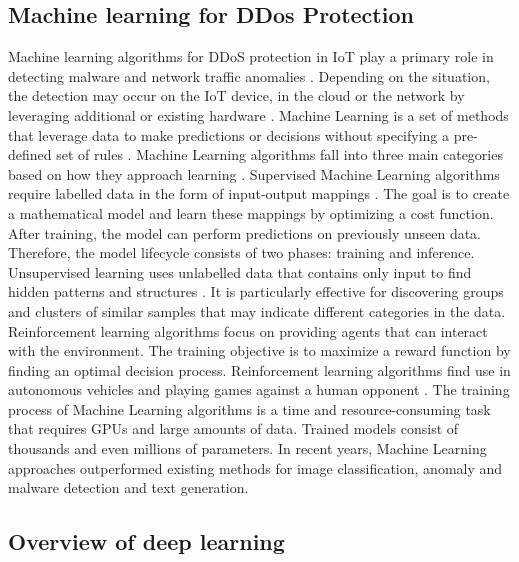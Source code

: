\documentclass[conference, 11pt]{IEEEtran}
\begin{document}
    \subsection{Machine learning for DDos Protection}
    Machine learning algorithms for DDoS protection in IoT play a primary role in detecting malware and network traffic anomalies \cite{article:18}.
    Depending on the situation, the detection may occur on the IoT device, in the cloud or the network by leveraging additional or existing hardware \cite{article:5}.
    Machine Learning is a set of methods that leverage data to make predictions or decisions without specifying a pre-defined set of rules \cite{Goodfellow-et-al-2016}.
    Machine Learning algorithms fall into three main categories based on how they approach learning \cite{article:6}.
    Supervised Machine Learning algorithms require labelled data in the form of input-output mappings \cite{Goodfellow-et-al-2016}.
    The goal is to create a mathematical model and learn these mappings by optimizing a cost function.
    After training, the model can perform predictions on previously unseen data.
    Therefore, the model lifecycle consists of two phases: training and inference.
    Unsupervised learning uses unlabelled data that contains only input to find hidden patterns and structures \cite{Goodfellow-et-al-2016}.
    It is particularly effective for discovering groups and clusters of similar samples that may indicate different categories in the data.
    Reinforcement learning algorithms focus on providing agents that can interact with the environment.
    The training objective is to maximize a reward function by finding an optimal decision process.
    Reinforcement learning algorithms find use in autonomous vehicles and playing games against a human opponent \cite{Goodfellow-et-al-2016}.
    The training process of Machine Learning algorithms is a time and resource-consuming task that requires GPUs and large amounts of data.
    Trained models consist of thousands and even millions of parameters.
    In recent years, Machine Learning approaches outperformed existing methods for image classification, anomaly and malware detection and text generation.

    \subsection{Overview of deep learning}
\end{document}
